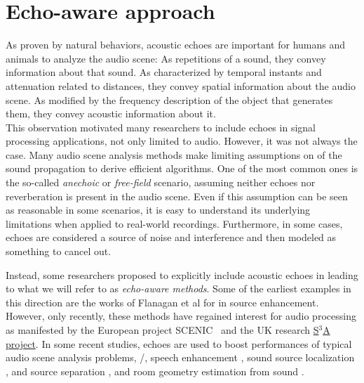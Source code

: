 \section{Echo-aware approach}
As proven by natural behaviors, acoustic echoes are important for humans and animals to analyze the audio scene:
As repetitions of a sound, they convey information about that sound.
As characterized by temporal instants and attenuation related to distances, they convey spatial information about the audio scene.
As modified by the frequency description of the object that generates them, they convey acoustic information about it.
\\This observation motivated many researchers to include echoes in signal processing applications, not only limited to audio.
However, it was not always the case.
Many audio scene analysis methods make limiting assumptions on of the sound propagation to derive efficient algorithms.
One of the most common ones is the so-called \textit{anechoic} or \textit{free-field} scenario, assuming neither echoes nor reverberation is present in the audio scene.
Even if this assumption can be seen as reasonable in some scenarios, it is easy to understand its underlying limitations when applied to real-world recordings.
Furthermore, in some cases, echoes are considered a source of noise and interference and then modeled as something to cancel out.

\mynewline
Instead, some researchers proposed to explicitly include acoustic echoes in leading to what we will refer to as \textit{echo-aware methods}.
Some of the earliest examples in this direction are the works of Flanagan et al for in source enhancement.
However, only recently, these methods have regained interest for audio processing as manifested by the European project SCENIC~ and the UK research \href{http://www.s3a-spatialaudio.org/}{S$^3$A project}.
In some recent studies, echoes are used to boost performances of typical audio scene analysis problems, \eg/, speech enhancement , sound source localization , and source separation , and room geometry estimation from sound .

